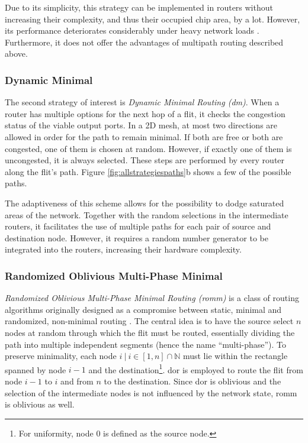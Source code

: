 Due to its simplicity, this strategy can be implemented in routers without increasing their complexity, and thus their occupied chip area, by a lot.
However, its performance deteriorates considerably under heavy network loads \cite[3]{nesson95romm}. Furthermore, it does not offer the advantages of
multipath routing described above.

\subsubsection{Dynamic Minimal}\label{subsubsec:dm}
The second strategy of interest is \textit{Dynamic Minimal Routing (\gls{dm})}. When a router has multiple options for the next hop of a flit, it checks
the congestion status of the viable output ports. In a 2D mesh, at most two directions are allowed in order for the path to remain minimal. If both
are free or both are congested, one of them is chosen at random. However, if exactly one of them is uncongested, it is always selected.
These steps are performed by every router along the flit's path. Figure \ref{fig:allstrategiespaths}b shows a few of the possible paths.

The adaptiveness of this scheme allows for the possibility to dodge saturated areas of the network. Together with the random selections in the
intermediate routers, it facilitates the use of multiple paths for each pair of source and destination node. However, it requires a random number
generator to be integrated into the routers, increasing their hardware complexity.

\subsubsection{Randomized Oblivious Multi-Phase Minimal}\label{subsubsec:romm}
\textit{Randomized Oblivious Multi-Phase Minimal Routing (\gls{romm})} is a class of routing algorithms originally designed as a compromise between
static, minimal and randomized, non-minimal routing \cite[3]{nesson95romm}. The central idea is to have the source select $n$ nodes at random
through which the flit must be routed, essentially dividing the path into multiple independent segments (hence the name \enquote{multi-phase}). To
preserve minimality, each node $i\ |\ i \in [1, n] \cap \mathbb{N}$ must lie within the rectangle spanned by node $i-1$ and the destination\footnote{For uniformity,
node $0$ is defined as the source node.}. \Gls{dor} is employed to route the flit from node $i-1$ to $i$ and from $n$ to the
destination. Since \gls{dor} is oblivious and the selection of the intermediate nodes is not influenced by the network state, \gls{romm} is oblivious
as well.

